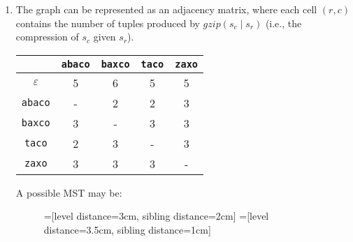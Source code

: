 \begin{enumerate}
  \item The graph can be represented as an adjacency matrix, where each cell
  $(r, c)$ contains the number of tuples produced by $gzip(s_c \mid s_r)$ (i.e.,
  the compression of $s_c$ given $s_r$).
  \begin{table}[H]
    \centering
    \begin{tabular}{c|c|c|c|c|}
      & {\tt abaco} & {\tt baxco} & {\tt taco} & {\tt zaxo} \\ \hline
      $\varepsilon$ & 5 & 6 & 5 & 5 \\ \hline
      {\tt abaco} & - & 2 & 2 & 3 \\ \hline
      {\tt baxco} & 3 & - & 3 & 3 \\ \hline
      {\tt taco} & 2 & 3 & - & 3 \\ \hline
      {\tt zaxo} & 3 & 3 & 3 & - \\ \hline
    \end{tabular}
  \end{table}
  A possible MST may be:
  \begin{figure}[H]
    \centering
    =[level distance=3cm, sibling distance=2cm]
    =[level distance=3.5cm, sibling distance=1cm]
  \end{figure}

\end{enumerate}
